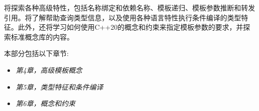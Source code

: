 将探索各种高级特性，包括名称绑定和依赖名称、模板递归、模板参数推断和转发引用。将了解帮助查询类型信息，以及使用各种语言特性执行条件编译的类型特征。此外，还将学习如何使用C++20的概念和约束来指定模板参数的要求，并探索标准概念库的内容。

本部分包括以下章节:

\begin{itemize}
\item
\textit{第4章，高级模板概念}

\item
\textit{第5章，类型特征和条件编译}

\item
\textit{第6章，概念和约束}
\end{itemize}







